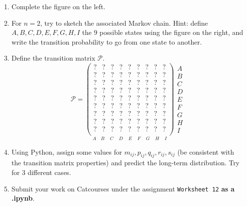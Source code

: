 \documentclass[11pt]{article}
\begin{document}
\begin{enumerate}
\item Complete the figure on the left.
\item For $n = 2$, try to sketch the associated Markov chain. Hint: define $A,B,C,D,E,F,G,H,I$ the 9 possible states using the figure on the right, and write the transition probability to go from one state to another.
\item Define the transition matrix $\mathcal{P}$.
\[\mathcal{P} = \underset{A\,\,\,\,\,\,B\,\,\,\,\,\,\,C\,\,\,\,\,\,\,D\,\,\,\,\,\,\,E\,\,\,\,\,\,\,F\,\,\,\,\,\,\,G\,\,\,\,\,\,\,H\,\,\,\,\,\,\,I}{\begin{pmatrix} ? &  ? &  ? &  ? &  ? &  ? &  ? &  ? &  ? \\
? &  ? &  ? &  ? &  ? &  ? &  ? &  ? &  ? \\
? &  ? &  ? &  ? &  ? &  ? &  ? &  ? &  ? \\
? &  ? &  ? &  ? &  ? &  ? &  ? &  ? &  ? \\
? &  ? &  ? &  ? &  ? &  ? &  ? &  ? &  ? \\
? &  ? &  ? &  ? &  ? &  ? &  ? &  ? &  ? \\
? &  ? &  ? &  ? &  ? &  ? &  ? &  ? &  ? \\
? &  ? &  ? &  ? &  ? &  ? &  ? &  ? &  ? \\
? &  ? &  ? &  ? &  ? &  ? &  ? &  ? &  ? \\
\end{pmatrix}} \begin{aligned} A \\ B \\ C \\ D \\ E \\ F \\ G \\ H \\ I \end{aligned}
\]
\item Using Python, assign some values for $m_{ij},p_{ij},q_{ij},r_{ij},s_{ij}$ (be consistent with the transition matrix properties) and predict the long-term distribution. Try for 3 different cases.
\item Submit your work on Catcourses under the assignment \texttt{Worksheet 12} \textbf{as a .ipynb}. 
\end{enumerate}
\end{document}
